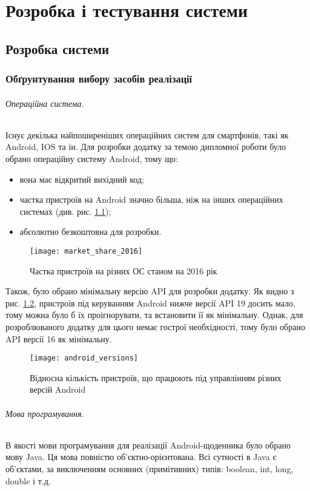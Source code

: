\documentclass[../main.tex]{subfiles}
\begin{document}
	
\chapter{Розробка і тестування системи}
	
\section{Розробка  системи}
	
\subsection{Обґрунтування вибору засобів реалізації}

\subparagraph{Операційна система.}
Існує декілька найпоширеніших операційних систем для смартфонів, такі як Android, IOS та ін. Для розробки додатку за темою дипломної роботи було обрано операційну систему Android, тому що: 
\begin{itemize}[label={--}]
	\item вона має відкритий вихідний код;
	\item частка пристроїв на Android значно більша, ніж на інших операційних системах (див. рис. \ref{chart:market_share});
	\item абсолютно безкоштовна для розробки.
\end{itemize}

\begin{figure}[H]
	\centering
	\texttt{[image: market\_share\_2016]}
	\caption{Частка пристроїв на різних ОС станом на 2016 рік}
	\label{chart:market_share}
\end{figure}

Також, було обрано мінімальну версію API для розробки додатку. Як видно з рис. \ref{chart:android_versions}, пристроїв під керуванням Android нижче версії API 19 досить мало, тому можна було б їх проігнорувати, та встановити її як мінімальну. Однак, для розроблюваного додатку для цього немає гострої необхідності, тому було обрано API версії 16 як мінімальну.\\

\begin{figure}[H]
	\centering
	\texttt{[image: android\_versions]}
	\caption{Відносна кількість пристроїв, що працюють під управлінням різних версій Android}
	\label{chart:android_versions}
\end{figure}

\subparagraph{Мова програмування.}
В якості мови програмування для реалізації Android-щоденника було обрано мову Java. Ця мова повністю об'єктно-\linebreak[0]орієнтована. Всі сутності в Java є об'єктами, за виключенням основних (примітивних) типів: boolean, int, long, double і т.д. 
\end{document}
